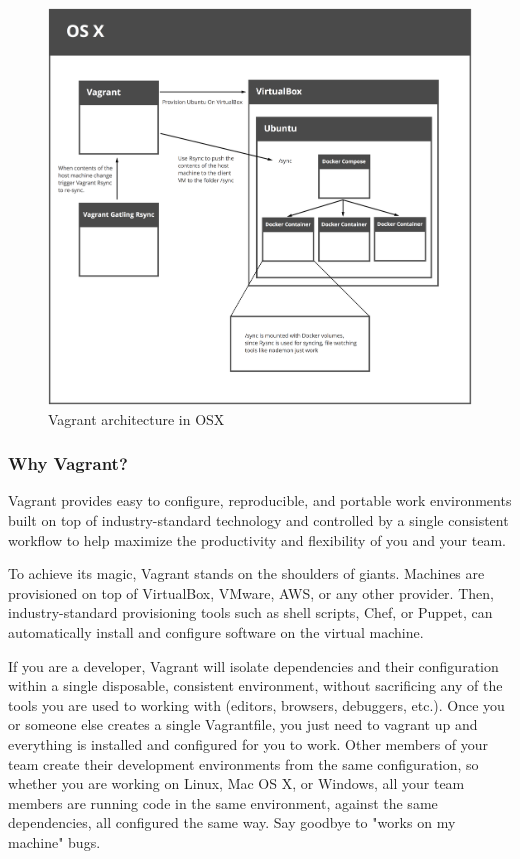 \documentclass[BTech]{srmuthesis}
\begin{document}
\begin{figure}[h]
    \centering
    \includegraphics[width=12cm\textwidth]{vagrant-layers}
    \caption{Vagrant architecture in OSX}
    \label{fig:vagrant_arch}
\end{figure}

\subsubsection{Why Vagrant?}

Vagrant provides easy to configure, reproducible, and portable work environments built on top of industry-standard technology and controlled by a single consistent workflow to help maximize the productivity and flexibility of you and your team.

To achieve its magic, Vagrant stands on the shoulders of giants. Machines are provisioned on top of VirtualBox, VMware, AWS, or any other provider. Then, industry-standard provisioning tools such as shell scripts, Chef, or Puppet, can automatically install and configure software on the virtual machine.

If you are a developer, Vagrant will isolate dependencies and their configuration within a single disposable, consistent environment, without sacrificing any of the tools you are used to working with (editors, browsers, debuggers, etc.). Once you or someone else creates a single Vagrantfile, you just need to vagrant up and everything is installed and configured for you to work. Other members of your team create their development environments from the same configuration, so whether you are working on Linux, Mac OS X, or Windows, all your team members are running code in the same environment, against the same dependencies, all configured the same way. Say goodbye to "works on my machine" bugs.
\end{document}
